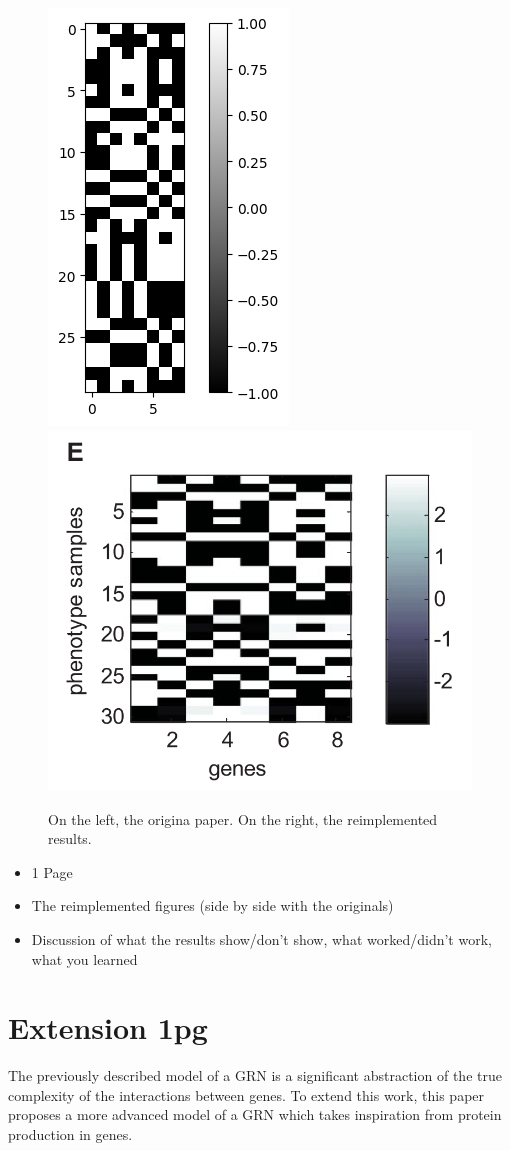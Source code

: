 \documentclass[twocolumn,a4paper]{article}
\begin{document}
    \begin{figure}[h]
        \includegraphics[width=0.45\linewidth]{img/fig2e.png}
        \includegraphics[width=0.45\linewidth]{orig_img/fig2e.png}
        \caption{On the left, the origina paper. On the right, the reimplemented results.}
    \end{figure}

    \begin{itemize}
        \item 1 Page
        \item The reimplemented figures (side by side with the originals)
        \item Discussion of what the results show/don't show, what worked/didn't work, what you learned
    \end{itemize}
    \section{Extension 1pg}
    The previously described model of a GRN is a significant abstraction of the true complexity of the interactions between genes. To extend this work, this paper proposes a more advanced model of a GRN which takes inspiration from protein production in genes.
\end{document}
